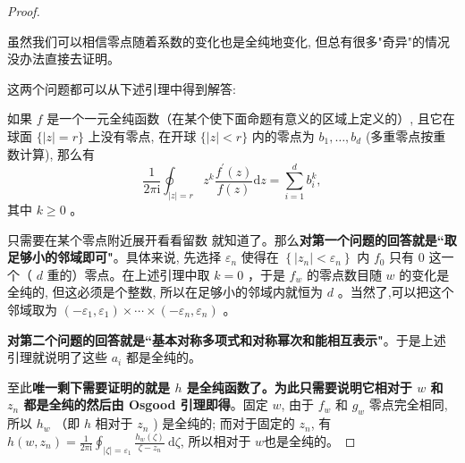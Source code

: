 \documentclass[lang=cn,12pt,a4paper,fontset=none]{beautybook}
\begin{document}
\begin{proof}
\begin{remark}
   虽然我们可以相信零点随着系数的变化也是全纯地变化, 但总有很多"奇异"的情况没办法直接去证明。
\end{remark}

这两个问题都可以从下述引理中得到解答:

\begin{lemma}
   如果 $f$ 是一个一元全纯函数（在某个使下面命题有意义的区域上定义的）, 且它在球面 $\{|z|=r\}$ 上没有零点, 在开球 $\{|z|<r\}$ 内的零点为 $b_1, \ldots, b_d$ (多重零点按重数计算), 那么有 
   $$\frac{1}{2 \pi \mathrm{i}} \oint_{|z|=r} z^k \frac{f^{\prime}(z)}{f(z)} \mathrm{d} z=\sum_{i=1}^d b_i^k,$$
   其中 $k \geq 0$ 。
\end{lemma}


   只需要在某个零点附近展开看看留数 就知道了。那么\textbf{对第一个问题的回答就是``取足够小的邻域即可"}。具体来说, 先选择 $\varepsilon_n$ 使得在 $\left\{\left|z_n\right|<\varepsilon_n\right\}$ 内 $f_0$ 只有 0 这一个（ $d$ 重的）零点。在上述引理中取 $k=0$ ，于是 $f_w$ 的零点数目随 $w$ 的变化是全纯的, 但这必须是个整数, 所以在足够小的邻域内就恒为 $d$ 。当然了,可以把这个邻域取为 $\left(-\varepsilon_1, \varepsilon_1\right) \times \cdots \times\left(-\varepsilon_n, \varepsilon_n\right)$ 。

\textbf{对第二个问题的回答就是``基本对称多项式和对称幂次和能相互表示"}。于是上述引理就说明了这些 $a_i$ 都是全纯的。


至此\textbf{唯一剩下需要证明的就是 $h$ 是全纯函数了。为此只需要说明它相对于 $w$ 和 $z_n$ 都是全纯的然后由 Osgood 引理即得}。固定 $w$, 由于 $f_w$ 和 $g_w$ 零点完全相同, 所以 $h_w$ （即 $h$ 相对于 $z_n$ ) 是全纯的; 而对于固定的 $z_n$, 有 $h\left(w, z_n\right)=\frac{1}{2 \pi \mathrm{i}} \oint_{|\zeta|=\varepsilon_1} \frac{h_w(\zeta)}{\zeta-z_n} \mathrm{~d} \zeta$, 所以相对于 $w$也是全纯的。
   
\end{proof}
\end{document}
